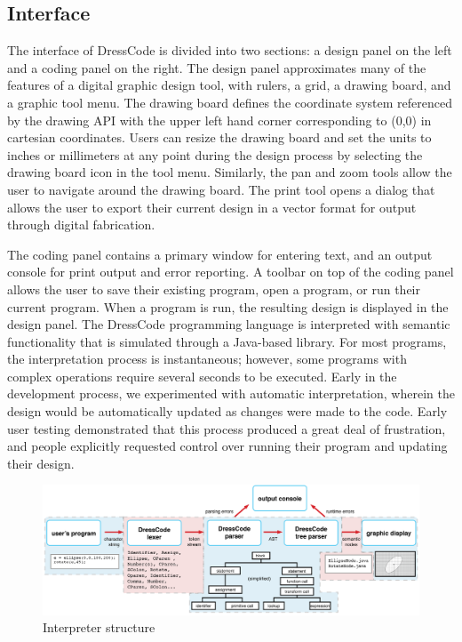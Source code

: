 \documentclass{sigchi}
\begin{document}
\subsection{Interface}
The interface of DressCode is divided into two sections: a design panel on the left and a coding panel on the right. The design panel approximates many of the features of a digital graphic design tool, with rulers, a grid, a drawing board, and a graphic tool menu. The drawing board defines the coordinate system referenced by the drawing API with the upper left hand corner corresponding to (0,0) in cartesian coordinates. Users can resize the drawing board and set the units to inches or millimeters at any point during the design process by selecting the drawing board icon in the tool menu. Similarly, the pan and zoom tools allow the user to navigate around the drawing board. The print tool opens a dialog that allows the user to export their current design in a vector format for output through digital fabrication. 

The coding panel contains a primary window for entering text, and an output console for print output and error reporting. A toolbar on top of the coding panel allows the user to save their existing program, open a program, or run their current program. When a program is run, the resulting design is displayed in the design panel. The DressCode programming language is interpreted with semantic functionality that is simulated through a Java-based library. For most programs, the interpretation process is instantaneous; however, some programs with complex operations require several seconds to be executed. Early in the development process, we experimented with automatic interpretation, wherein the design would be automatically updated as changes were made to the code. Early user testing demonstrated that this process produced a great deal of frustration, and people explicitly requested control over running their program and updating their design.

\begin{center}
\begin{figure}[h!]
\includegraphics[width=\textwidth]{images/interpreter_structure_horz.png}
\caption{Interpreter structure}
\label{fig:interpreter_structure}
\end{figure}
\end{center}
\end{document}
